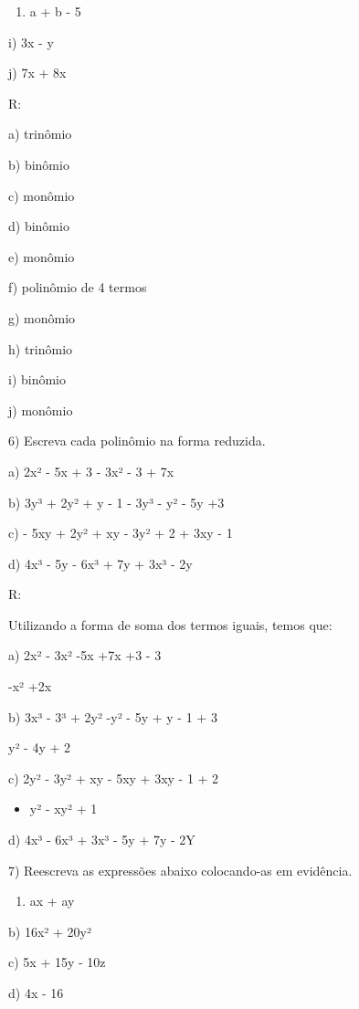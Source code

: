 \begin{enumerate}
\def\labelenumi{\alph{enumi})}
\setcounter{enumi}{7}
\tightlist
\item
  a + b - 5
\end{enumerate}

i) 3x - y

j) 7x + 8x

R:

a) trinômio

b) binômio

c) monômio

d) binômio

e) monômio

f) polinômio de 4 termos

g) monômio

h) trinômio

i) binômio

j) monômio

6) Escreva cada polinômio na forma reduzida.

a) 2x² - 5x + 3 - 3x² - 3 + 7x

b) 3y³ + 2y² + y - 1 - 3y³ - y² - 5y +3

c) - 5xy + 2y² + xy - 3y² + 2 + 3xy - 1

d) 4x³ - 5y - 6x³ + 7y + 3x³ - 2y

R:

Utilizando a forma de soma dos termos iguais, temos que:

a) 2x² - 3x² -5x +7x +3 - 3

-x² +2x

b) 3x³ - 3³ + 2y² -y² - 5y + y - 1 + 3

y² - 4y + 2

c) 2y² - 3y² + xy - 5xy + 3xy - 1 + 2

\begin{itemize}
\tightlist
\item
  y² - xy² + 1
\end{itemize}

d) 4x³ - 6x³ + 3x³ - 5y + 7y - 2Y

7) Reescreva as expressões abaixo colocando-as em evidência.

\begin{enumerate}
\def\labelenumi{\alph{enumi})}
\tightlist
\item
  ax + ay
\end{enumerate}

b) 16x² + 20y²

c) 5x + 15y - 10z

d) 4x - 16

